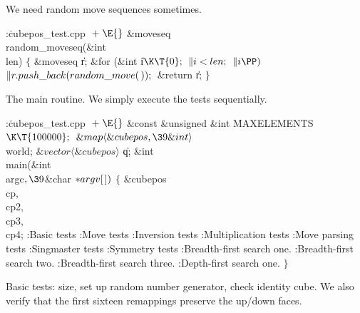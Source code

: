We need random move sequences sometimes.

\Y\B\4:\.{cubepos\_test.cpp }\X${}\mathrel+\E{}$\6
\&{moveseq} \\{random\_moveseq}(\&{int} \\{len})\1\1\2\2\6
${}\{{}$\1\6
\&{moveseq} \|r;\7
\&{for} (\&{int} \|i${}\K\T{0};{}$ ${}\|i<\\{len};{}$ ${}\|i\PP){}$\1\5
${}\|r.\\{push\_back}(\\{random\_move}(\,));{}$\2\6
\&{return} \|r;\6
\4${}\}{}$\2\par
\fi

The main routine.  We simply execute the tests sequentially.

\Y\B\4:\.{cubepos\_test.cpp }\X${}\mathrel+\E{}$\6
\&{const} \&{unsigned} \&{int} \.{MAXELEMENTS}${}\K\T{100000};{}$\6
${}\&{map}\langle\&{cubepos},\39\&{int}\rangle{}$ \\{world};\6
${}\&{vector}\langle\&{cubepos}\rangle{}$ \|q;\7
\&{int} \\{main}(\&{int} \\{argc}${},\39{}$\&{char} ${}{*}\\{argv}[\,]){}$\1\1%
\2\2\6
${}\{{}$\1\6
\&{cubepos} \\{cp}${},{}$ \\{cp2}${},{}$ \\{cp3}${},{}$ \\{cp4};\7
:Basic tests\X\6
:Move tests\X\6
:Inversion tests\X\6
:Multiplication tests\X\6
:Move parsing tests\X\6
:Singmaster tests\X\6
:Symmetry tests\X\6
:Breadth-first search one.\X\6
:Breadth-first search two.\X\6
:Breadth-first search three.\X\6
:Depth-first search one.\X\6
\4${}\}{}$\2\par
\fi

Basic tests: size, set up random number generator, check identity
cube.  We also verify that the first sixteen remappings preserve the
up/down faces.

